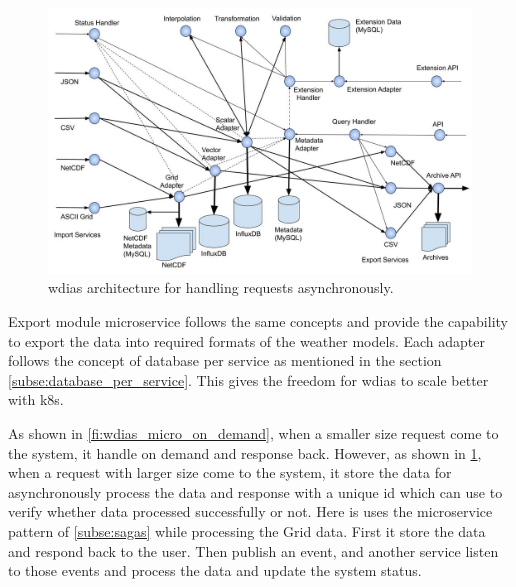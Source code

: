 \begin{figure}[htp]
    \centering
    \includegraphics[width=1\textwidth]{method/microservice/microservice_architecture-handle_on_async-v3.jpg}
    \caption{\acrshort{wdias} architecture for handling requests asynchronously.}
    \label{fi:wdias_micro_async}
\end{figure}
Export module microservice follows the same concepts and provide the capability to export the data into required formats of the weather models.
Each adapter follows the concept of database per service as mentioned in the section \cref{subse:database_per_service}. This gives the freedom for \acrshort{wdias} to scale better with \acrshort{k8s}.

As shown in \cref{fi:wdias_micro_on_demand}, when a smaller size request come to the system, it handle on demand and response back. However, as shown in \cref{fi:wdias_micro_async}, when a request with larger size come to the system, it store the data for asynchronously process the data and response with a unique id which can use to verify whether data processed successfully or not. Here is uses the microservice pattern of \cref{subse:sagas} while processing the Grid data. First it store the data and respond back to the user. Then publish an event, and another service listen to those events and process the data and update the system status.

